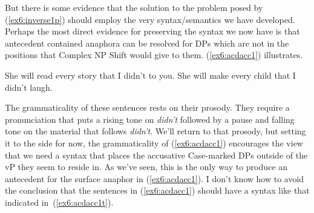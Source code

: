 But there is some evidence that the solution to the problem posed by (\ref{ex6:inverse1p}) should employ the very syntax/semantics we have developed. Perhaps the most direct evidence for preserving the syntax we now have is that antecedent contained anaphora can be resolved for DPs which are not in the positions that Complex NP Shift would give to them. (\ref{ex6:acdacc1}) illustrates.
\begin{exe}
\raggedright
	\ex \label{ex6:acdacc1}
	\begin{xlist}
		\ex She will read every story that I didn't to you.
		\ex She will make every child that I didn't laugh. 
	\end{xlist}
\end{exe}%
%
%
%
The grammaticality of these sentences rests on their prosody. They require a pronunciation that puts a rising tone on \emph{didn't} followed by a pause and falling tone on the material that follows \emph{didn't}. We'll return to that prosody, but setting it to the side for now, the grammaticality of (\ref{ex6:acdacc1}) encourages the view that we need a syntax that places the accusative Case-marked DPs outside of the vP they seem to reside in. As we've seen, this is the only way to produce an antecedent for the surface anaphor in (\ref{ex6:acdacc1}). I don't know how to avoid the conclusion that the sentences in (\ref{ex6:acdacc1}) should have a syntax like that indicated in~(\ref{ex6:acdacc1t}).
\medskip
